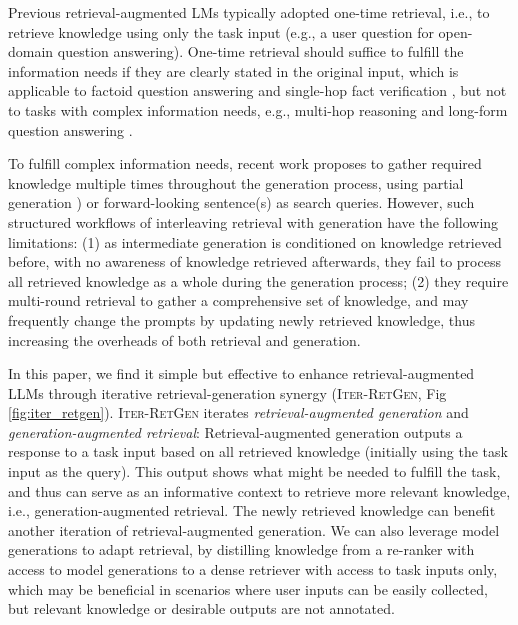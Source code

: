 \documentclass[11pt]{article}
\begin{document}
Previous retrieval-augmented LMs \cite{DBLP:journals/corr/abs-2208-03299,DBLP:journals/corr/abs-2301-12652} typically adopted one-time retrieval, i.e., to retrieve knowledge using only the task input (e.g., a user question for open-domain question answering).
One-time retrieval should suffice to fulfill the information needs if they are clearly stated in the original input, which is applicable to factoid question answering \cite{DBLP:journals/tacl/KwiatkowskiPRCP19} and single-hop fact verification \cite{thorne-etal-2018-fever}, but not to tasks with complex information needs, e.g., multi-hop reasoning \cite{DBLP:conf/emnlp/Yang0ZBCSM18} and long-form question answering \cite{DBLP:conf/acl/FanJPGWA19}.

To fulfill complex information needs, recent work proposes to gather required knowledge multiple times throughout the generation process, using partial generation \cite{DBLP:journals/corr/abs-2212-10509,DBLP:journals/corr/abs-2210-03350}) or forward-looking sentence(s) \cite{DBLP:journals/corr/abs-2305-06983} as search queries.
However, such structured workflows of interleaving retrieval with generation have the following limitations:
(1) as intermediate generation is conditioned on knowledge retrieved before, with no awareness of knowledge retrieved afterwards, they fail to process all retrieved knowledge as a whole during the generation process;
(2) they require multi-round retrieval to gather a comprehensive set of knowledge, and may frequently change the prompts by updating newly retrieved knowledge, thus increasing the overheads of both retrieval and generation.

In this paper, we find it simple but effective to enhance retrieval-augmented LLMs through iterative retrieval-generation synergy (I\textsc{ter}-R\textsc{et}G\textsc{en}, Fig \ref{fig:iter_retgen}).
I\textsc{ter}-R\textsc{et}G\textsc{en} iterates \textit{retrieval-augmented generation} and \textit{generation-augmented retrieval}:
Retrieval-augmented generation outputs a response to a task input based on all retrieved knowledge (initially using the task input as the query).
This output shows what might be needed to fulfill the task, and thus can serve as an informative context to retrieve more relevant knowledge, i.e., generation-augmented retrieval.
The newly retrieved knowledge can benefit another iteration of retrieval-augmented generation.
We can also leverage model generations to adapt retrieval, by distilling knowledge from a re-ranker with access to model generations to a dense retriever with access to task inputs only, which may be beneficial in scenarios where user inputs can be easily collected, but relevant knowledge or desirable outputs are not annotated.
\end{document}
